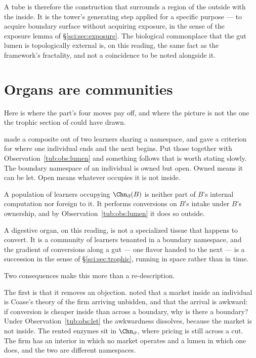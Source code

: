 A tube is therefore the construction that surrounds a region of the outside with
the inside. It is the tower's generating step applied for a specific purpose ---
to acquire boundary surface without acquiring exposure, in the sense of the
exposure lemma of \S\ref{sci:sec:exposure}. The biological commonplace that the
gut lumen is topologically external \cite{stevenshume1995} is, on this reading,
the same fact as the framework's fractality, and not a coincidence to be noted
alongside it.

\section{Organs are communities}
\label{tub:sec:organs}

Here is where the part's four moves pay off, and where the picture is not the
one the trophic section of \chSci could have drawn.

\chComp made a composite out of two learners sharing a namespace, and \chEng
gave a criterion for where one individual ends and the next begins. Put those
together with Observation~\ref{tub:obs:lumen} and something follows that is
worth stating slowly. The boundary namespace of an individual is owned but open.
Owned means it can be let. Open means whatever occupies it is not inside.

\begin{observation}
\label{tub:obs:let}
A population of learners occupying $\Chn_{\partial}(B)$ is neither part of $B$'s
internal computation nor foreign to it. It performs conversions on $B$'s intake
under $B$'s ownership, and by Observation~\ref{tub:obs:lumen} it does so
outside.
\end{observation}

A digestive organ, on this reading, is not a specialized tissue that happens to
convert. It is a community of learners tenanted in a boundary namespace, and the
gradient of conversions along a gut --- one flavor handed to the next --- is a
succession in the sense of \S\ref{sci:sec:trophic}, running in space rather than
in time.

Two consequences make this more than a re-description.

The first is that it removes an objection. \chEng noted that a market inside an
individual is Coase's theory of the firm \cite{coase} arriving unbidden, and that
the arrival is awkward: if conversion is cheaper inside than across a boundary,
why is there a boundary? Under Observation~\ref{tub:obs:let} the awkwardness
dissolves, because the market is not inside. The rented enzymes sit in
$\Chn_{\partial}$, where pricing is still across a cut. The firm has an interior
in which no market operates and a lumen in which one does, and the two are
different namespaces.

